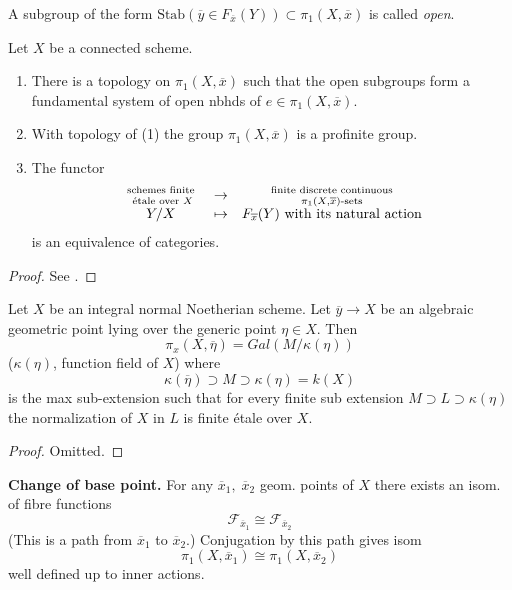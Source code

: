 \begin{definition}
\label{definition-open}
A subgroup of the form
$\text{Stab}(\overline y\in F_{\overline x}(Y))\subset \pi_1(X, \overline x)$
is called {\it open}.
\end{definition}

\begin{theorem}[Grothendieck]
\label{theorem-fundamental-group}
Let $X$ be a connected scheme.
\begin{enumerate}
\item There is a topology on $\pi_1(X, \overline x)$ such that the open
subgroups form a fundamental system of open nbhds of $e\in \pi_1(X, \overline
x)$.
\item With topology of (1) the group
$\pi_1(X, \overline x)$ is a profinite group.
\item The functor
$$
\begin{matrix}
\text{ schemes finite }\atop \text{ \'etale over }X & \to &
\text{ finite discrete continuous }\atop \pi_1(X, \overline x)\text{-sets}\\
Y / X& \mapsto & F_{\overline x}(Y) \text{ with its natural action}
\end{matrix}
$$
is an equivalence of categories.
\end{enumerate}
\end{theorem}

\begin{proof}
See \cite{SGA1}.
\end{proof}

\begin{proposition}
\label{proposition-integral-normal-fundamental-group}
Let $X$ be an integral normal Noetherian scheme. Let
$\overline y\to X$ be an algebraic geometric point lying
over the generic point $\eta\in X$. Then
$$
\pi_x(X, \overline \eta) = Gal(M/\kappa(\eta))
$$
($\kappa(\eta)$, function field of $X$) where
$$
\kappa(\overline \eta)\supset M\supset \kappa(\eta) = k(X)
$$
is the max sub-extension such that for every finite sub extension
$M\supset L\supset \kappa(\eta)$ the normalization of $X$ in $L$ is finite
\'etale over $X$.
\end{proposition}

\begin{proof}
Omitted.
\end{proof}

\noindent
{\bf Change of base point.} For any $\overline x_1, \; \overline x_2$
geom. points of $X$ there exists an isom. of fibre functions
$$
\mathcal{F}_{\overline x_1} \cong \mathcal{F}_{\overline x_2}
$$
(This is a path from $\overline x_1$ to $\overline x_2$.) Conjugation
by this path gives isom
$$
\pi_1(X, \overline x_1) \cong \pi_1(X, \overline x_2)
$$
well defined up to inner actions.

